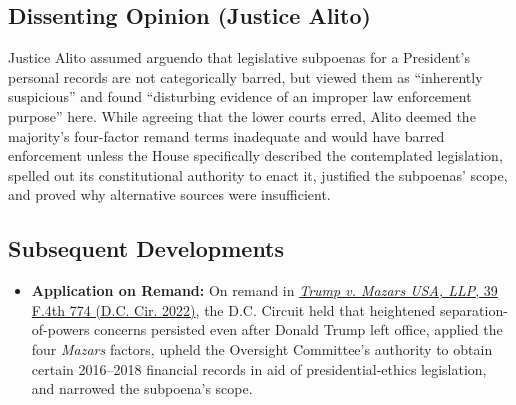 \documentclass[12pt]{article}
\begin{document}
\subsection{Dissenting Opinion (Justice Alito)}

Justice Alito assumed arguendo that legislative subpoenas for a President's personal records are not categorically barred, but viewed them as ``inherently suspicious'' and found ``disturbing evidence of an improper law enforcement purpose'' here. While agreeing that the lower courts erred, Alito deemed the majority's four-factor remand terms inadequate and would have barred enforcement unless the House specifically described the contemplated legislation, spelled out its constitutional authority to enact it, justified the subpoenas' scope, and proved why alternative sources were insufficient.

\subsection{Subsequent Developments}

\begin{itemize}

\item \textbf{Application on Remand:} On remand in \href{https://law.justia.com/cases/federal/appellate-courts/cadc/21-5176/21-5176-2022-07-08.html}{\textit{Trump v. Mazars USA, LLP}, 39 F.4th 774 (D.C. Cir. 2022)}, the D.C. Circuit held that heightened separation-of-powers concerns persisted even after Donald Trump left office, applied the four \textit{Mazars} factors, upheld the Oversight Committee's authority to obtain certain 2016--2018 financial records in aid of presidential-ethics legislation, and narrowed the subpoena's scope.

\end{itemize}
\end{document}
